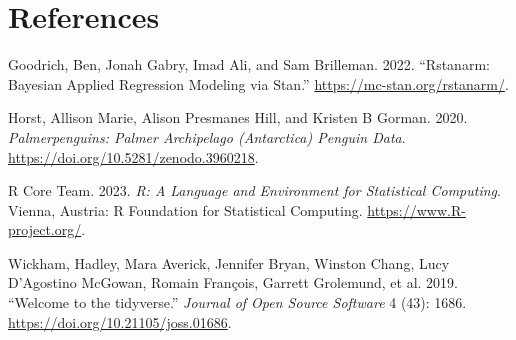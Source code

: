 \documentclass[
  letterpaper,
  DIV=11,
  numbers=noendperiod]{scrartcl}
\newlength{\cslhangindent}
\newenvironment{CSLReferences}[2] %
 {\begin{list}{}{%
  \setlength{\itemindent}{0pt}
  \setlength{\leftmargin}{0pt}
  \setlength{\parsep}{0pt}
  \ifodd #1
   \setlength{\leftmargin}{\cslhangindent}
   \setlength{\itemindent}{-1\cslhangindent}
  \fi
  \setlength{\itemsep}{#2\baselineskip}}}
 {\end{list}}
\begin{document}
\newpage

\section*{References}\label{references}

\label{refs}
\begin{CSLReferences}{1}{0}
Goodrich, Ben, Jonah Gabry, Imad Ali, and Sam Brilleman. 2022.
{``Rstanarm: {Bayesian} Applied Regression Modeling via {Stan}.''}
\url{https://mc-stan.org/rstanarm/}.

Horst, Allison Marie, Alison Presmanes Hill, and Kristen B Gorman. 2020.
\emph{Palmerpenguins: Palmer Archipelago (Antarctica) Penguin Data}.
\url{https://doi.org/10.5281/zenodo.3960218}.

R Core Team. 2023. \emph{R: A Language and Environment for Statistical
Computing}. Vienna, Austria: R Foundation for Statistical Computing.
\url{https://www.R-project.org/}.

Wickham, Hadley, Mara Averick, Jennifer Bryan, Winston Chang, Lucy
D'Agostino McGowan, Romain François, Garrett Grolemund, et al. 2019.
{``Welcome to the {tidyverse}.''} \emph{Journal of Open Source Software}
4 (43): 1686. \url{https://doi.org/10.21105/joss.01686}.

\end{CSLReferences}
\end{document}
